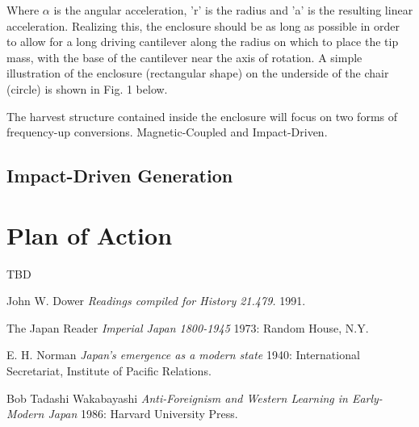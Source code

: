 \documentclass[paper=letter, fontsize=12pt]{scrartcl}
\begin{document}
\noindent
Where $\alpha$ is the angular acceleration, 'r' is the radius and 'a' is the resulting linear acceleration. Realizing  this, the enclosure should be as long as possible in order to allow for a long driving cantilever along the radius on which to place the tip mass, with the base of the cantilever near the axis of rotation. A simple illustration of the enclosure (rectangular shape) on the underside of the chair (circle) is shown in Fig. 1 below.

The harvest structure contained inside the enclosure will focus on two forms of frequency-up conversions. Magnetic-Coupled and Impact-Driven.


\subsection{Impact-Driven Generation}


\section{Plan of Action}

TBD

\begin{thebibliography}{1}

 John W. Dower {\em Readings compiled for History
  21.479.}  1991.

  The Japan Reader {\em Imperial Japan 1800-1945} 1973:
  Random House, N.Y.

 E. H. Norman {\em Japan's emergence as a modern
  state} 1940: International Secretariat, Institute of Pacific
  Relations.

 Bob Tadashi Wakabayashi {\em Anti-Foreignism and Western
  Learning in Early-Modern Japan} 1986: Harvard University Press.

\end{thebibliography}
  
\end{document}
